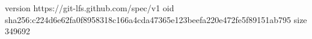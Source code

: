 version https://git-lfs.github.com/spec/v1
oid sha256:c224d6e62fa0f8958318c166a4cda47365e123beefa220e472fe5f89151ab795
size 349692
